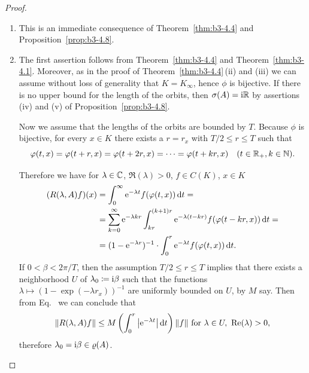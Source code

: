 \begin{proof}
\begin{enumerate}[\upshape (i), wide, labelindent=.25em]%
\item 
	This is an immediate consequence of Theorem~\ref{thm:b3-4.4} and Proposition~\ref{prop:b3-4.8}.
	
\item 
	The first assertion follows from Theorem~\ref{thm:b3-4.4} and Theorem~\ref{thm:b3-4.1}.
	Moreover, as in the proof of Theorem~\ref{thm:b3-4.4}\,(ii) and (iii) we can assume without loss of generality that $K = K_{\infty}$, hence $\phi$ is bijective.
	If there is no upper bound for the length of the orbits, then $\sigma(A) = \mathrm{i}\mathbb{R}$ by assertions (iv) and (v) of Proposition~\ref{prop:b3-4.8}.
	
	Now we assume that the lengths of the orbits are bounded by $T$.
	Because $\phi$ is bijective, for every $x \in K$ there exists a $r = r_{x}$ with $T/2 \leq r \leq T$ such that 
	\[
	\phi(t,x) = \phi(t+r,x) = \phi(t+2r,x) = \cdots = \phi(t+kr,x) \quad (t \in \R_{+}, k \in \N).
	\]
	
	Therefore we have for $\lambda \in \mathbb{C}$, $\Re(\lambda) > 0$, $f \in C(K)$, $x \in K$
	\begin{equation}\label{eq:b3-4.15}
		\begin{split}
			(R(\lambda,A)f)(x) &= \int_{0}^{\infty} \eu^{-\lambda t}f(\phi(t,x)) \dt = \\
			&= \sum_{k=0}^{\infty} \eu^{-\lambda kr}\int_{kr}^{(k+1)r} \eu^{-\lambda(t-kr)} f(\phi(t-kr,x)) \dt =  \\
			&= (1 - \eu^{-\lambda r})^{-1}\cdot\int_{0}^{r} \eu^{-\lambda t} f(\phi(t,x)) \dt .
		\end{split}
	\end{equation}
	If\/ $0 < \beta < 2\pi/T$, then the assumption $T/2 \leq r \leq T$ implies that there exists a neighborhood $U$ of\/ $\lambda_{0} \coloneq \mathrm{i}\beta$ such that the functions $\lambda \mapsto (1 - \exp(-\lambda r_{x}))^{-1}$ are uniformly bounded on $U$, by $M$ say.
    Then from Eq.~ we can conclude that 
    \[
    \|R(\lambda,A)f\| \leq M\left(\int_{0}^{r} \left|\eu^{-\lambda t}\right|\dt\right)\|f\| \text{ for } \lambda \in U , \ \Re(\lambda) > 0 , 
    \]
    therefore $\lambda_{0} = \im\beta \in \rho(A)$.
    \qedhere
\end{enumerate}
\end{proof}
